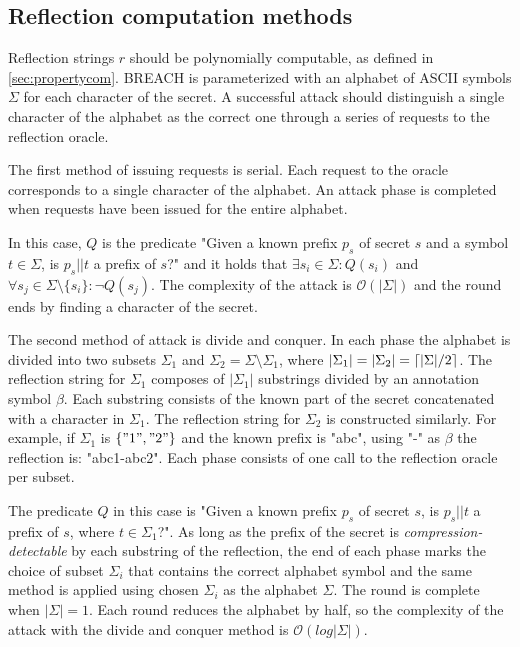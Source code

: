 \documentclass[conference, letterpaper, 10pt]{IEEEtran}
\DeclarePairedDelimiter{\ceil}{\lceil}{\rceil}
\begin{document}
\subsection{Reflection computation methods}\label{subsec:reflectionmethods}
Reflection strings $r$ should be polynomially computable, as defined in
\ref{sec:propertycom}. BREACH is
parameterized with an alphabet of ASCII symbols $\Sigma$
for each character of the
secret. A successful attack should distinguish a single character of the
alphabet as the correct one through a series of requests to the reflection
oracle.

The first method of issuing requests is serial. Each request to the oracle
corresponds to a single character of the alphabet. An attack phase is completed
when requests have been issued for the entire alphabet.

In this case, $Q$ is the predicate "Given a known prefix $p_s$ of secret $s$ and
a symbol $t \in \Sigma$, is $p_s || t$ a prefix of $s$?" and it holds that $\exists
s_i \in \Sigma: Q(s_i)$ and $\forall s_j \in \Sigma \setminus \{s_i\}:
\lnot Q(s_j)$. The complexity of the attack is $\mathcal{O}(|\Sigma|)$ and
the round ends by finding a character of the secret.

The second method of attack is divide and conquer. In each phase the alphabet is
divided into two subsets $\Sigma_1$ and $\Sigma_2 =
\Sigma
\setminus \Sigma_1$, where $|\Sigma_1| = |\Sigma_2| =
\ceil{|\Sigma| / 2}$. The reflection string for $\Sigma_1$ composes of
$|\Sigma_1|$ substrings divided by an annotation symbol $\beta$. Each
substring consists of the known part of the secret concatenated with a character
in $\Sigma_1$. The reflection string for $\Sigma_2$ is constructed
similarly. For example, if $\Sigma_1$ is $\{"1", "2"\}$ and the known prefix is
"abc", using "-" as $\beta$ the reflection is: "abc1-abc2".
Each phase consists of one call to the reflection oracle per subset.

The predicate $Q$ in this case is "Given a known prefix $p_s$ of secret $s$, is
$p_s || t$ a
prefix of $s$, where $t \in \Sigma_1$?". As long as the prefix of the
secret is \textit{compression-detectable} by each substring of the reflection,
the end of each phase marks the choice of subset $\Sigma_i$ that contains
the correct alphabet symbol and the same method is applied using chosen
$\Sigma_i$ as the alphabet $\Sigma$. The round is complete when
$|\Sigma| = 1$. Each round reduces the alphabet by half, so the complexity
of the attack with the divide and conquer method  is
$\mathcal{O}(log|\Sigma|)$.
\end{document}
